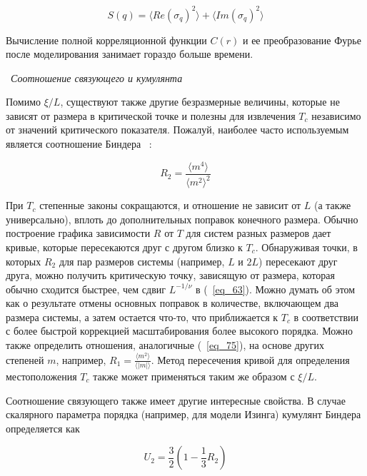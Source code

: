 \documentclass[11pt]{article}
\begin{document}
\begin{equation}
S(q)=\langle Re(\sigma_q)^2 \rangle + \langle Im(\sigma_q )^2 \rangle
\label{eq_74}
\end{equation}

Вычисление полной корреляционной функции $C(r)$ и ее преобразование Фурье после моделирования занимает гораздо больше времени.

~\emph{Соотношение связующего и кумулянта}

Помимо $\xi / L$, существуют также другие безразмерные величины, которые не зависят от размера в критической точке и полезны для извлечения $T_c$ независимо от значений критического показателя. Пожалуй, наиболее часто используемым является соотношение Биндера ~\cite{prl_47_693, prb_30_1477}:

\begin{equation}
R_2 = \frac{\langle m^4 \rangle}{\langle m^2\rangle ^2}
\label{eq_75}
\end{equation}

При $T_c$ степенные законы сокращаются, и отношение не зависит от $L$ (а также универсально), вплоть до дополнительных поправок конечного размера. Обычно построение графика зависимости $R$ от $T$ для систем разных размеров дает кривые, которые пересекаются друг с другом близко к $T_c$. Обнаруживая точки, в которых $R_2$ для пар размеров системы (например, $L$ и $2L$) пересекают друг друга, можно получить критическую точку, зависящую от размера, которая обычно сходится быстрее, чем сдвиг $L^{ −1/\nu}$ в (~\ref{eq_63}). Можно думать об этом как о результате отмены основных поправок в количестве, включающем два размера системы, а затем остается что-то, что приближается к $T_c$ в соответствии с более быстрой коррекцией масштабирования более высокого порядка. Можно также определить отношения, аналогичные (~\ref{eq_75}), на основе других степеней $m$, например, $R_1 = \frac{\langle m^2 \rangle}{\langle |m| \rangle} $. Метод пересечения кривой для определения местоположения $T_c$ также может применяться таким же образом с $\xi/L$.

Соотношение связующего также имеет другие интересные свойства. В случае скалярного параметра порядка (например, для модели Изинга) кумулянт Биндера определяется как

\begin{equation}
U_2 = \frac{3}{2}(1-\frac{1}{3}R_2)
\label{eq_76}
\end{equation}
\end{document}
